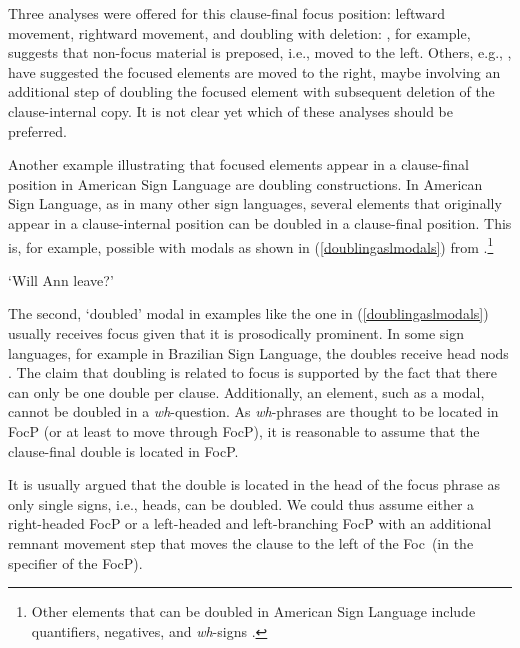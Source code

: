 \noindent Three analyses were offered for this clause-final focus position: leftward movement, rightward movement, and  doubling with deletion: \citet{wilbur1997prosodic}, for example, suggests that non-focus material is preposed, i.e., moved to the left. Others, e.g., \citet{petronio1993clause}, have suggested the focused elements are moved to the right, maybe involving an additional step of doubling the focused element with subsequent deletion of the clause-internal copy. It is not clear yet which of these analyses should be preferred.

Another example illustrating that focused elements appear in a clause-final position in American Sign Language are doubling constructions. In American Sign Language, as in many other sign languages, several elements that originally appear in a clause-internal position can be doubled in a clause-final position. This is, for example, possible with modals as shown in (\ref{doublingaslmodals}) from \citet[135]{petronio1993clause}.\footnote{Other elements that can be doubled in American Sign Language include quantifiers, negatives, and \textit{wh}-signs \citep{petronio1993clause}.}

\begin{exe}
\ex {}
\glt `Will Ann leave?' \label{doublingaslmodals}
\end{exe}

\noindent The second, `doubled' modal in examples like the one in (\ref{doublingaslmodals}) usually receives focus given that it is prosodically prominent. In some sign languages, for example in Brazilian Sign Language, the doubles receive head nods \citep{de1999phrase}. The claim that doubling is related to focus is supported by the fact that there can only be one double per clause. Additionally, an element, such as a modal, cannot be doubled in a \textit{wh}-question. As \textit{wh}-phrases are thought to be located in FocP (or at least to move through FocP), it is reasonable to assume that the clause-final double is located in FocP.

It is usually argued that the double is located in the head of the focus phrase as only single signs, i.e., heads, can be doubled. We could thus assume either a right-headed FocP or a left-headed and left-branching FocP with an additional remnant movement step that moves the clause to the left of the Foc\textdegree\ (in the specifier of the FocP).

